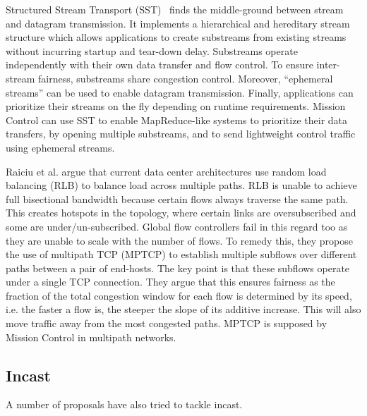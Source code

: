 \documentclass[a4paper,12pt,twoside,openright]{report}
\begin{document}
Structured Stream Transport (SST)~\cite{Ford:2007:SSN} finds the middle-ground
between stream and datagram transmission. It implements a hierarchical and
hereditary stream structure which allows applications to create substreams from
existing streams without incurring startup and tear-down delay. Substreams
operate independently with their own data transfer and flow control. To ensure
inter-stream fairness, substreams share congestion control. Moreover,
``ephemeral streams'' can be used to enable datagram transmission. Finally,
applications can prioritize their streams on the fly depending on runtime
requirements. Mission Control can use SST to enable MapReduce-like systems to
prioritize their data transfers, by opening multiple substreams, and to send
lightweight control traffic using ephemeral streams.

Raiciu et al.\cite{Raiciu:2010:DCN} argue that current data center architectures
use random load balancing (RLB) to balance load across multiple paths. RLB is
unable to achieve full bisectional bandwidth because certain flows always
traverse the same path. This creates hotspots in the topology, where certain
links are oversubscribed and some are under/un-subscribed. Global flow
controllers fail in this regard too as they are unable to scale with the number
of flows. To remedy this, they propose the use of multipath TCP (MPTCP) to
establish multiple subflows over different paths between a pair of end-hosts.
The key point is that these subflows operate under a single TCP connection. They
argue that this ensures fairness as the fraction of the total congestion window
for each flow is determined by its speed, i.e. the faster a flow is, the steeper
the slope of its additive increase. This will also move traffic away from the
most congested paths. MPTCP is supposed by Mission Control in multipath
networks.

\subsection{Incast}
A number of proposals have also tried to tackle incast. 
\end{document}
